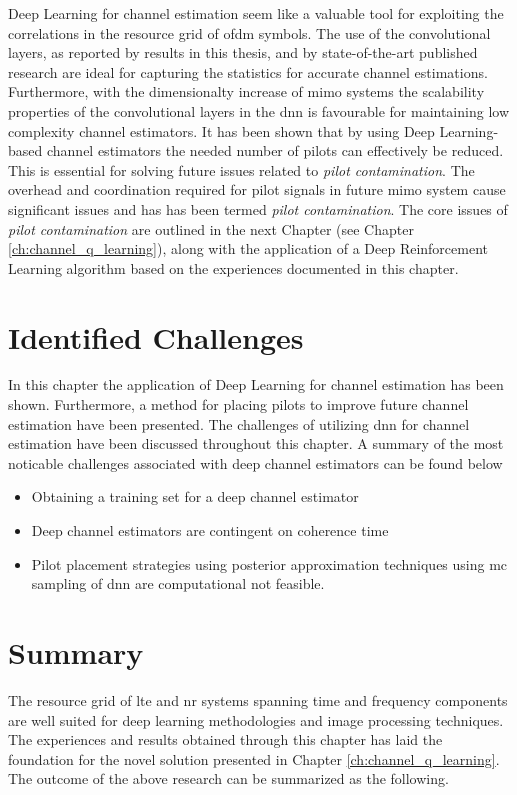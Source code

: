 Deep Learning for channel estimation seem like a valuable tool for exploiting the correlations in the resource grid of \gls{ofdm} symbols. The use of the convolutional layers, as reported by results in this thesis, and by state-of-the-art published research are ideal for capturing the statistics for accurate channel estimations. Furthermore, with the dimensionalty increase of \gls{mimo} systems the scalability properties of the convolutional layers in the \gls{dnn} is favourable for maintaining low complexity channel estimators. It has been shown that by using Deep Learning-based channel estimators the needed number of pilots can effectively be reduced. This is essential for solving future issues related to \emph{pilot contamination}. The overhead and coordination required for pilot signals in future \gls{mimo} system cause significant issues and has has been termed \emph{pilot contamination}. The core issues of \emph{pilot contamination} are outlined in the next Chapter (see Chapter \ref{ch:channel_q_learning}), along with the application of a Deep Reinforcement Learning algorithm based on the experiences documented in this chapter.

\section{Identified Challenges}\label{sec:channel_estimation_challenges}
In this chapter the application of Deep Learning for channel estimation has been shown. Furthermore, a method for placing pilots to improve future channel estimation have been presented. The challenges of utilizing \gls{dnn} for channel estimation have been discussed throughout this chapter. A summary of the most noticable challenges associated with deep channel estimators can be found below
\begin{itemize}
    \item Obtaining a training set for a deep channel estimator
    \item Deep channel estimators are contingent on coherence time
    \item Pilot placement strategies using posterior approximation techniques using \gls{mc} sampling of \gls{dnn} are computational not feasible.
\end{itemize}

\section{Summary}
The resource grid of \gls{lte} and \gls{nr} systems spanning time and frequency components are well suited for deep learning methodologies and image processing techniques. The experiences and results obtained through this chapter has laid the foundation for the novel solution presented in  Chapter \ref{ch:channel_q_learning}. The outcome of the above research can be summarized as the following.

